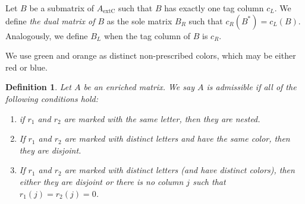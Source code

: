 \documentclass[a4paper,10pt]{report}
\theoremstyle{plain}
\theoremstyle{remark}
\theoremstyle{plain}
\newtheorem{defn}{Definition}[chapter]
\newcommand*{\extC}{\mathrm{extC}}
\begin{document}
\vspace{1mm}
Let $B$ be a submatrix of $A_{\extC}$ such that $B$ has exactly one tag column $c_L$. We define \emph{the dual matrix of $B$} as the sole matrix $B_R$ such that $c_R(B^*) = c_L(B)$. Analogously, we define $B_L$ when the tag column of $B$ is $c_R$. 

\vspace{1mm}
We use green and orange as distinct non-prescribed colors, which may be either red or blue.


\begin{defn}
	Let $A$ be an enriched matrix. We say $A$ is \emph{admissible} if all of the following conditions hold:
	\begin{enumerate}
	    \item if $r_1$ and $r_2$ are marked with the same letter, then they are nested.  \label{itm:1_def_adm}

	 
	 	\item If $r_1$ and $r_2$ are marked with distinct letters and have the same color, then they are disjoint. \label{itm:2_def_adm}
	 	

	 	
	 	\item If $r_1$ and $r_2$ are marked with distinct letters (and have distinct colors), then either they are disjoint or there is no column $j$ such that $r_1(j) = r_2(j) = 0$. \label{itm:3_def_adm}
	

\end{enumerate}
\end{defn}
\end{document}
